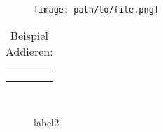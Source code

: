 
\begin{figure}[H]
    \begin{center}
        \texttt{[image: path/to/file.png]}
        \caption{\imgfilename}
        \label{fig:A1_label}
    \end{center}
\end{figure}



\begin{table}[ht]
    \centering
    \begin{tabular}{|c|c|c|c|}\hline
    \tbf{}     & \tbf{} & \tbf{} \\ \hline
                       &    &            \\
                 &   &         \\ \hline
                     &  &  \\ \hline
    \end{tabular}
    \caption{Beispiel Addieren:}
\end{table}


\iffalse
\fi

\begin{figure}[H]
\begin{center}
 \\
\caption{label2}
\label{some example}
\end{center}
\end{figure}
